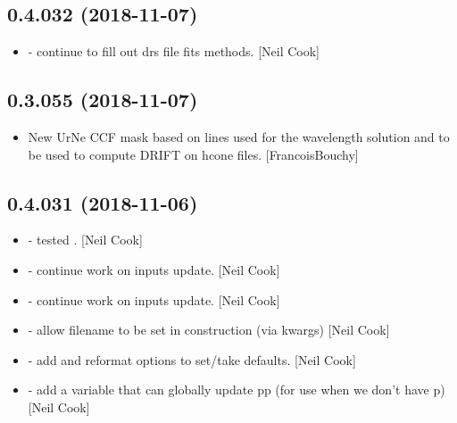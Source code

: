 \documentclass[a4paper,10pt,english]{report}
\begin{document}
\subsection{0.4.032 (2018-11-07)}
\label{\detokenize{misc/changelog:id266}}\begin{itemize}
\item {} 
 - continue to fill out drs file fits methods. {[}Neil
Cook{]}

\end{itemize}


\subsection{0.3.055 (2018-11-07)}
\label{\detokenize{misc/changelog:id267}}\begin{itemize}
\item {} 
New UrNe CCF mask based on lines used for the wavelength solution and
to be used to compute DRIFT on hcone files. {[}FrancoisBouchy{]}

\end{itemize}


\subsection{0.4.031 (2018-11-06)}
\label{\detokenize{misc/changelog:id268}}\begin{itemize}
\item {} 
 - tested . {[}Neil Cook{]}

\item {} 
 - continue work on inputs update. {[}Neil Cook{]}

\item {} 
 - continue work on inputs update. {[}Neil Cook{]}

\item {} 
 - allow filename to be set in construction (via kwargs)
{[}Neil Cook{]}

\item {} 
 - add and reformat options to set/take defaults.
{[}Neil Cook{]}

\item {} 
 - add a variable that can globally update pp (for use
when we don’t have p) {[}Neil Cook{]}

\end{itemize}
\end{document}
